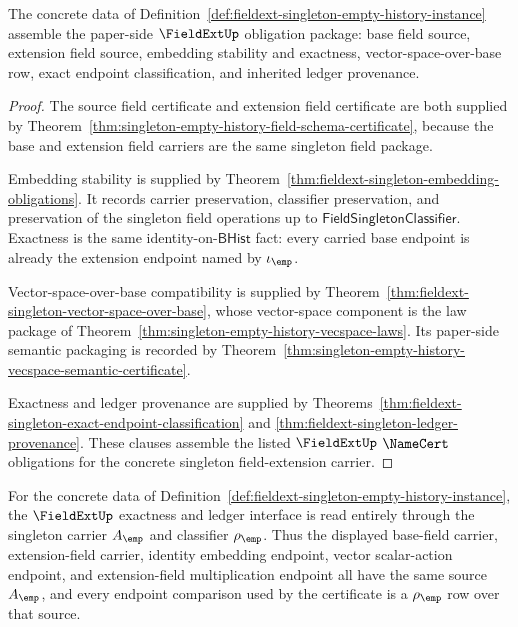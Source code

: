 \begin{theorem}
\label{thm:fieldext-singleton-certificate-obligation-package}
The concrete data of
Definition~\ref{def:fieldext-singleton-empty-history-instance} assemble the
paper-side $\FieldExtUp$ obligation package: base field source, extension
field source, embedding stability and exactness, vector-space-over-base row,
exact endpoint classification, and inherited ledger provenance.
\end{theorem}
\begin{proof}
The source field certificate and extension field certificate are both supplied
by Theorem~\ref{thm:singleton-empty-history-field-schema-certificate}, because
the base and extension field carriers are the same singleton field package.

Embedding stability is supplied by
Theorem~\ref{thm:fieldext-singleton-embedding-obligations}. It records carrier
preservation, classifier preservation, and preservation of the singleton field
operations up to $\mathsf{FieldSingletonClassifier}$. Exactness is the same
identity-on-$\mathsf{BHist}$ fact: every carried base endpoint is already the
extension endpoint named by $\iota_{\emp}$.

Vector-space-over-base compatibility is supplied by
Theorem~\ref{thm:fieldext-singleton-vector-space-over-base}, whose
vector-space component is the law package of
Theorem~\ref{thm:singleton-empty-history-vecspace-laws}. Its paper-side
semantic packaging is recorded by
Theorem~\ref{thm:singleton-empty-history-vecspace-semantic-certificate}.

Exactness and ledger provenance are supplied by
Theorems~\ref{thm:fieldext-singleton-exact-endpoint-classification} and
\ref{thm:fieldext-singleton-ledger-provenance}. These clauses assemble the
listed $\FieldExtUp$ $\NameCert$ obligations for the concrete singleton
field-extension carrier.
\end{proof}

\begin{definition}
\label{def:fieldext-singleton-exactness-ledger-interface}
For the concrete data of
Definition~\ref{def:fieldext-singleton-empty-history-instance}, the
$\FieldExtUp$ exactness and ledger interface is read entirely through the
singleton carrier $A_{\emp}$ and classifier $\rho_{\emp}$. Thus the displayed
base-field carrier, extension-field carrier, identity embedding endpoint,
vector scalar-action endpoint, and extension-field multiplication endpoint
all have the same source $A_{\emp}$, and every endpoint comparison used by
the certificate is a $\rho_{\emp}$ row over that source.
\end{definition}

